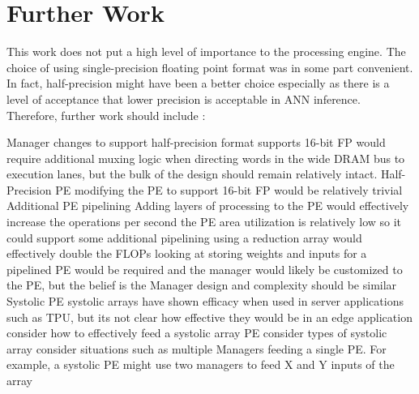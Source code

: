 \documentclass[journal]{IEEEtran}
\begin{document}
\section{Further Work}
\label{sec:Further Work}
This work does not put a high level of importance to the processing engine. The choice of using single-precision floating point format was in some part convenient. In fact, half-precision might have been a better choice especially as there
is a level of acceptance that lower precision is acceptable in ANN inference.
Therefore, further work should include :
\begin {outline}
  \1 Manager changes to support half-precision format
    \2 supports 16-bit FP would require additional muxing logic when directing words in the wide DRAM bus to execution lanes, but the bulk of the design should remain relatively intact.
  \1 Half-Precision PE
    \2 modifying the PE to support 16-bit FP would be relatively trivial
  \1 Additional PE pipelining
    \2 Adding layers of processing to the PE would effectively increase the operations per second
      \3 the PE area utilization is relatively low so it could support some additional pipelining
      \3 using a reduction array would effectively double the FLOPs
      \3 looking at storing weights and inputs for a pipelined PE would be required and the manager would likely be customized to the PE, but the belief is the Manager design and complexity should be similar
  \1 Systolic PE
    \2 systolic arrays have shown efficacy when used in server applications such as TPU, but its not clear how effective they would be in an edge application
      \3 consider how to effectively feed a systolic array PE
      \3 consider types of systolic array
      \3 consider situations such as multiple Managers feeding a single PE. For example, a systolic PE might use two managers to feed X and Y inputs of the array
 
\end{outline}
\fi


\ifCLASSOPTIONcaptionsoff
  \newpage
\fi



\end{document}
